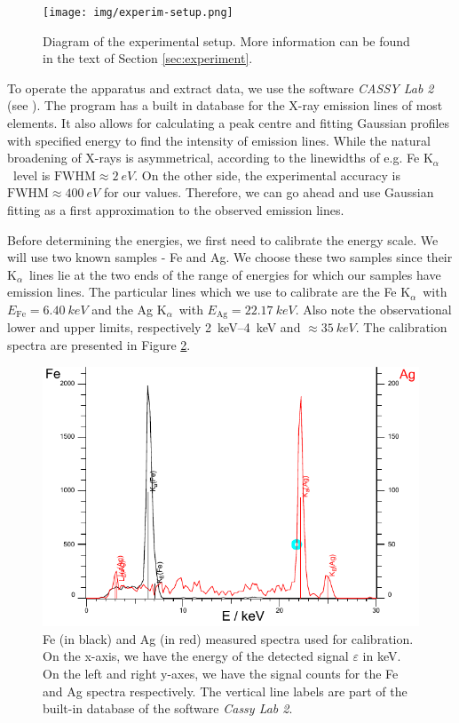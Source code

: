 \documentclass[11pt,a4paper,twoside,onecolumn]{article}
\newcommand{\Kalpha}{$\mathrm{K}_\alpha$~}
\begin{document}
\begin{figure}[!htbp]
    \centering
    \texttt{[image: img/experim-setup.png]}
    \caption{Diagram of the experimental setup. More information can be found in the text of Section \ref{sec:experiment}.}\label{fig:experim-setup}
\end{figure}

To operate the apparatus and extract data, we use the software \emph{CASSY Lab 2} (see \cite{cassylab2}). The program has a built in database for the X-ray emission lines of most elements. It also allows for calculating a peak centre and fitting Gaussian profiles with specified energy to find the intensity of emission lines. While the natural broadening of X-rays is asymmetrical, according to \cite{Krause1979} the linewidths of e.g. Fe \Kalpha level is $\mathrm{FWHM} \approx \qty{2}{eV}$. On the other side, the experimental accuracy is $\mathrm{FWHM} \approx \qty{400}{eV}$ for our values. Therefore, we can go ahead and use Gaussian fitting as a first approximation to the observed emission lines.

Before determining the energies, we first need to calibrate the energy scale. We will use two known samples - Fe and Ag. We choose these two samples since their \Kalpha lines lie at the two ends of the range of energies for which our samples have emission lines. The particular lines which we use to calibrate are the Fe \Kalpha with $E_\mathrm{Fe} = \qty{6.40}{keV}$ and the Ag \Kalpha with $E_\mathrm{Ag} = \qty{22.17}{keV}$. Also note the observational lower and upper limits, respectively \qtyrange{2}{4}{keV} and $\approx \qty{35}{keV}$. The calibration spectra are presented in Figure \ref{fig:calibration}.

\begin{figure}[!htbp]
    \centering
    \includegraphics[width=\textwidth]{img/calibration.pdf}
    \caption{Fe (in black) and Ag (in red) measured spectra used for calibration. On the x-axis, we have the energy of the detected signal $\varepsilon$ in \unit{keV}. On the left and right y-axes, we have the signal counts for the Fe and Ag spectra respectively. The vertical line labels are part of the built-in database of the software \emph{Cassy Lab 2}.}\label{fig:calibration}
\end{figure}
\end{document}
